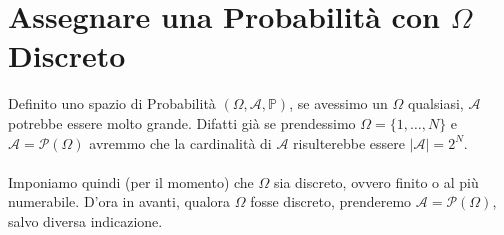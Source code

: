 \section{Assegnare una Probabilità con $\Omega$ Discreto}\label{sec:omega-discreto}
Definito uno spazio di Probabilità $(\Omega, \mathcal{A}, \mathbb{P})$, se avessimo un $\Omega$ qualsiasi, $\mathcal{A}$ potrebbe essere molto grande. Difatti già se prendessimo $\Omega = \{1, \dots, N\}$ e $\mathcal{A}=\mathcal{P}(\Omega )$ avremmo che la cardinalità di $\mathcal{A}$ risulterebbe essere $|\mathcal{A}| = 2^N$.\\
\\
Imponiamo quindi (per il momento) che $\Omega$ sia discreto, ovvero finito o al più numerabile. D'ora in avanti, qualora $\Omega$ fosse discreto, prenderemo $\mathcal{A} = \mathcal{P}(\Omega)$, salvo diversa indicazione.

